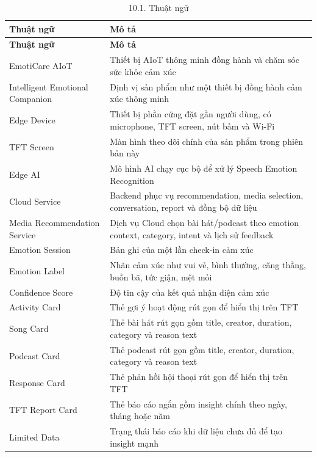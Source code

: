 \documentclass[12pt,a4paper]{article}
\begin{document}
\begin{center}
\begin{longtable}{|P{0.30\textwidth}|P{0.62\textwidth}|}
\caption{10.1. Thuật ngữ}\\
\hline
\textbf{Thuật ngữ} & \textbf{Mô tả} \\
\hline
\endfirsthead
\hline
\textbf{Thuật ngữ} & \textbf{Mô tả} \\
\hline
\endhead
EmotiCare AIoT & Thiết bị AIoT thông minh đồng hành và chăm sóc sức khỏe cảm xúc \\
\hline
Intelligent Emotional Companion & Định vị sản phẩm như một thiết bị đồng hành cảm xúc thông minh \\
\hline
Edge Device & Thiết bị phần cứng đặt gần người dùng, có microphone, TFT screen, nút bấm và Wi-Fi \\
\hline
TFT Screen & Màn hình theo dõi chính của sản phẩm trong phiên bản này \\
\hline
Edge AI & Mô hình AI chạy cục bộ để xử lý Speech Emotion Recognition \\
\hline
Cloud Service & Backend phục vụ recommendation, media selection, conversation, report và đồng bộ dữ liệu \\
\hline
Media Recommendation Service & Dịch vụ Cloud chọn bài hát/podcast theo emotion context, category, intent và lịch sử feedback \\
\hline
Emotion Session & Bản ghi của một lần check-in cảm xúc \\
\hline
Emotion Label & Nhãn cảm xúc như vui vẻ, bình thường, căng thẳng, buồn bã, tức giận, mệt mỏi \\
\hline
Confidence Score & Độ tin cậy của kết quả nhận diện cảm xúc \\
\hline
Activity Card & Thẻ gợi ý hoạt động rút gọn để hiển thị trên TFT \\
\hline
Song Card & Thẻ bài hát rút gọn gồm title, creator, duration, category và reason text \\
\hline
Podcast Card & Thẻ podcast rút gọn gồm title, creator, duration, category và reason text \\
\hline
Response Card & Thẻ phản hồi hội thoại rút gọn để hiển thị trên TFT \\
\hline
TFT Report Card & Thẻ báo cáo ngắn gồm insight chính theo ngày, tháng hoặc năm \\
\hline
Limited Data & Trạng thái báo cáo khi dữ liệu chưa đủ để tạo insight mạnh \\
\hline
\end{longtable}
\end{center}
\end{document}
